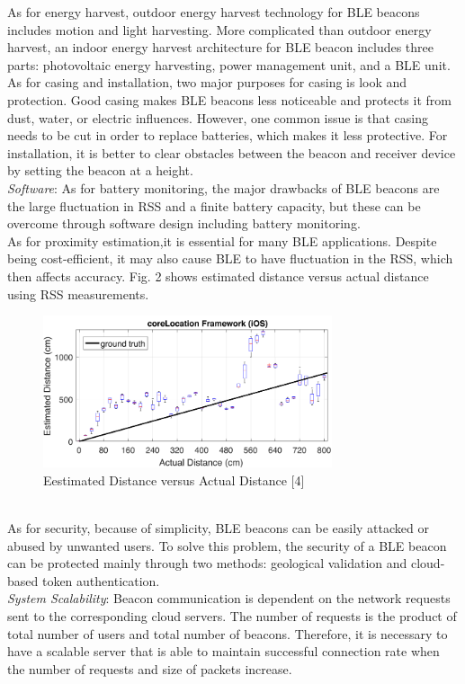 \documentclass[conference]{IEEEtran}
\begin{document}
\text{\quad} As for energy harvest, outdoor energy harvest technology for BLE beacons includes motion and light harvesting. More complicated than outdoor energy harvest, an indoor energy harvest architecture for BLE beacon includes three parts: photovoltaic energy harvesting, power management unit, and a BLE unit. \\
\text{\quad} As for casing and installation, two major purposes for casing is look and protection. Good casing makes BLE beacons less noticeable and protects it from dust, water, or electric influences. However, one common issue is that casing needs to be cut in order to replace batteries, which makes it less protective. For installation, it is better to clear obstacles between the beacon and receiver device by setting the beacon at a height.\\
\text{\quad} \textit{Software}: As for battery monitoring, the major drawbacks of BLE beacons are the large fluctuation in RSS and a finite battery capacity, but these can be overcome through software design including battery monitoring.\\
\text{\quad} As for proximity estimation,it is essential for many BLE applications. Despite being cost-efficient, it may also cause BLE to have fluctuation in the RSS, which then affects accuracy. Fig. 2 shows estimated distance versus actual distance using RSS measurements. 
\begin{figure}[htbp]
\centerline{\includegraphics[width=8.5cm]{2.png}}
\caption{Eestimated Distance versus Actual Distance [4]}
\label{fig}
\end{figure} \\
\text{\quad} As for security, because of simplicity, BLE beacons can be easily attacked or abused by unwanted users. To solve this problem, the security of a BLE beacon can be protected mainly through two methods: geological validation and cloud-based token authentication.\\
\text{\quad} \textit{System Scalability}: Beacon communication is dependent on the network requests sent to the corresponding cloud servers. The number of requests is the product of total number of users and total number of beacons. Therefore, it is necessary to have a scalable server that is able to maintain successful connection rate when the number of requests and size of packets increase. 
\end{document}
